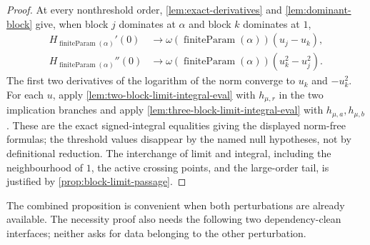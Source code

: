 \documentclass[9pt]{extarticle}
\theoremstyle{definition}
\theoremstyle{remark}
\begin{document}
\begin{proof}
At every nonthreshold order, \cref{lem:exact-derivatives} and
\cref{lem:dominant-block} give, when block $j$ dominates at $\alpha$ and block
$k$ dominates at $1$,
\begin{align*}
 H_{\operatorname{finiteParam}(\alpha)}'(0)
   &\longrightarrow\omega(\operatorname{finiteParam}(\alpha))(u_j-u_k),\\
 H_{\operatorname{finiteParam}(\alpha)}''(0)
   &\longrightarrow\omega(\operatorname{finiteParam}(\alpha))(u_k^2-u_j^2).
\end{align*}
The first two derivatives of the logarithm of the norm converge to $u_k$ and
$-u_k^2$.  For each $u$, apply
\cref{lem:two-block-limit-integral-eval} with $h_{\mu,r}$ in the two
implication branches and apply
\cref{lem:three-block-limit-integral-eval} with $h_{\mu,a},h_{\mu,b}$.
These are the exact signed-integral equalities giving the displayed
norm-free formulas; the threshold values disappear by the named null
hypotheses, not by definitional reduction.  The
interchange of limit and integral, including the neighbourhood of $1$, the
active crossing points, and the large-order tail, is justified by
\cref{prop:block-limit-passage}.
\end{proof}

The combined proposition is convenient when both perturbations are already
available.  The necessity proof also needs the following two dependency-clean
interfaces; neither asks for data belonging to the other perturbation.
\end{document}
